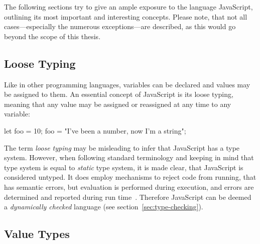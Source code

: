 
The following sections try to give an ample exposure to the language JavaScript, outlining its most important and interesting concepts. Please note, that not all cases---especially the numerous exceptions---are described, as this would go beyond the scope of this thesis.

\subsection{Loose Typing}
\label{sec:untyped-loosely-typed}

Like in other programming languages, variables can be declared and values may be assigned to them. An essential concept of JavaScript is its loose typing, meaning that any value may be assigned or reassigned at any time to any variable:
\begin{JsCode}[numbers=none]
let foo = 10;
foo = "I've been a number, now I'm a string";
\end{JsCode}
The term \emph{loose typing} may be misleading to infer that JavaScript has a type system. However, when following standard terminology and keeping in mind that type system is equal to \emph{static} type system, it is made clear, that JavaScript is considered untyped. It does employ mechanisms to reject code from running, that has semantic errors, but evaluation is performed during execution, and errors are determined and reported during run time~\cite[p.~291]{ES6Spec:Ecma:2015}. Therefore JavaScript can be deemed a \emph{dynamically checked} language (see section~\ref{sec:type-checking}).

\subsection{Value Types}
\label{sec:value-types}

